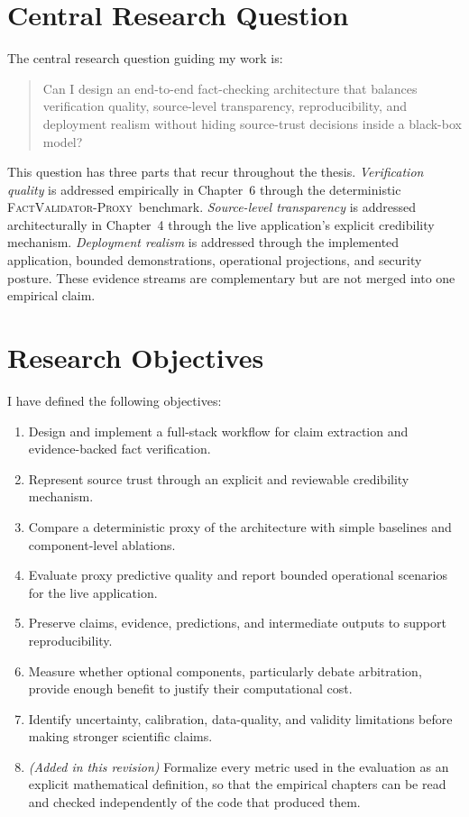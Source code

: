 \documentclass[12pt,a4paper,openany]{report}
\newcommand{\proxy}{\textsc{FactValidator-Proxy}}
\begin{document}
\section{Central Research Question}
The central research question guiding my work is:
\begin{quote}
Can I design an end-to-end fact-checking architecture that balances verification quality, source-level transparency, reproducibility, and deployment realism without hiding source-trust decisions inside a black-box model?
\end{quote}

This question has three parts that recur throughout the thesis. \emph{Verification quality} is addressed empirically in Chapter~6 through the deterministic \proxy\ benchmark. \emph{Source-level transparency} is addressed architecturally in Chapter~4 through the live application's explicit credibility mechanism. \emph{Deployment realism} is addressed through the implemented application, bounded demonstrations, operational projections, and security posture. These evidence streams are complementary but are not merged into one empirical claim.

\section{Research Objectives}
I have defined the following objectives:
\begin{enumerate}
  \item Design and implement a full-stack workflow for claim extraction and evidence-backed fact verification.
  \item Represent source trust through an explicit and reviewable credibility mechanism.
  \item Compare a deterministic proxy of the architecture with simple baselines and component-level ablations.
  \item Evaluate proxy predictive quality and report bounded operational scenarios for the live application.
  \item Preserve claims, evidence, predictions, and intermediate outputs to support reproducibility.
  \item Measure whether optional components, particularly debate arbitration, provide enough benefit to justify their computational cost.
  \item Identify uncertainty, calibration, data-quality, and validity limitations before making stronger scientific claims.
  \item \emph{(Added in this revision)} Formalize every metric used in the evaluation as an explicit mathematical definition, so that the empirical chapters can be read and checked independently of the code that produced them.
\end{enumerate}
\end{document}

